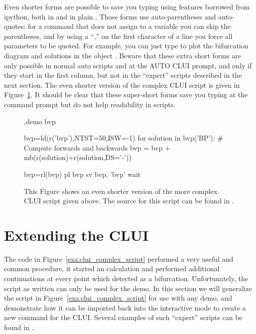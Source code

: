 \documentclass[12pt]{report}
\begin{document}
 Even shorter forms are possible to save you typing using features
 borrowed from ipython, both in  and in plain
 . Those forms use auto-parentheses and auto-quotes:
 for a command that does not assign to a variable you can skip the
 parentheses, and by using a ``,'' on the first character of a line
 you force all parameters to be quoted. For example, you can just
 type  to plot the bifurcation diagram and solutions
 in the object .
 Beware that these extra short forms are only possible in
 normal auto scripts and at the AUTO CLUI prompt, and only if they
 start in the first column, but not in the
 ``expert'' scripts described in the next section.
 The even shorter version of the complex \AUTO
 CLUI script is given in Figure~\ref{exa:clui_complex_fifth}.
 It should be clear that these super-short forms save you typing
 at the command prompt but do not help readability in scripts.
 \begin{figure}[htbp]
 {\small \begin{center} \begin{boxedverbatim}
 ,demo bvp

 bvp=ld(r('bvp'),NTST=50,ISW=-1)
 for solution in bvp('BP'):
     # Compute forwards and backwards
     bvp = bvp + mb(r(solution)+r(solution,DS='-'))

 bvp=rl(bvp)
 pl bvp
 sv bvp, 'bvp'
 wait
 \end{boxedverbatim}
 \end{center} 
 }
 \caption[Another complex example of a \AUTO CLUI script.]
 {This Figure shows an even shorter version of the more complex \AUTO CLUI
   script given above.
 The source for this script can be found in .
 }
 \label{exa:clui_complex_fifth}
 \end{figure}



 \section{ Extending the \AUTO CLUI } \label{sec:clui_extending}

 The code in Figure~\ref{exa:clui_complex_script}
 performed a very useful and common procedure, it started an \AUTO
 calculation and performed additional continuations
 at every point which \AUTO detected as a bifurcation.
 Unfortunately, the script as written can only be used
 for the  demo.  In this section we will 
 generalize the script in Figure~\ref{exa:clui_complex_script}
 for use with any demo, and demonstrate how it
 can be imported back into the interactive
 mode to create a new command
 for the \AUTO CLUI.  Several examples of such
 ``expert'' scripts can be found in .
\end{document}

